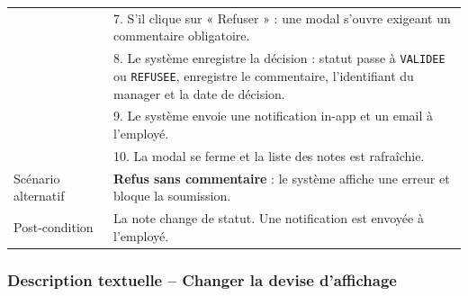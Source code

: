 \documentclass[12pt,a4paper]{report}
\begin{document}
\begin{longtable}{|p{3.5cm}|p{11cm}|}
& 7. S’il clique sur « Refuser » : une modal s’ouvre exigeant un commentaire obligatoire. \\

& 8. Le système enregistre la décision : statut passe à \texttt{VALIDEE} ou \texttt{REFUSEE}, enregistre le commentaire, l’identifiant du manager et la date de décision. \\

& 9. Le système envoie une notification in-app et un email à l’employé. \\

& 10. La modal se ferme et la liste des notes est rafraîchie. \\

\hline

 {Scénario alternatif} & \textbf{Refus sans commentaire} : le système affiche une erreur et bloque la soumission. \\

\hline

Post‑condition & La note change de statut. Une notification est envoyée à l’employé. \\

\hline

\end{longtable}





\newpage

\subsubsection{Description textuelle – Changer la devise d’affichage}
\end{document}
